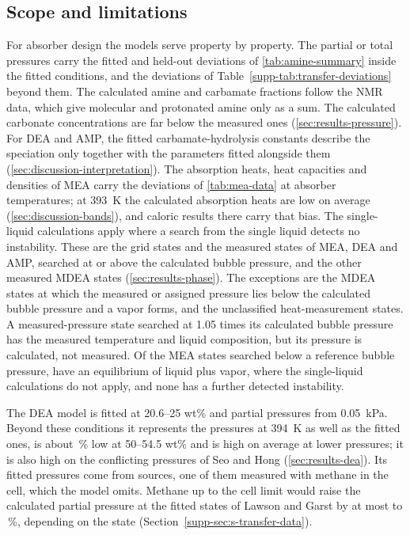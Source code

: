 \subsection{Scope and limitations}\label{sec:limits}
For absorber design the models serve property by property.
The \COtwo partial or total pressures carry the fitted and held-out deviations of \cref{tab:amine-summary} inside the fitted conditions, and the deviations of Table~\ref{supp-tab:transfer-deviations} beyond them.
The calculated amine and carbamate fractions follow the NMR data, which give molecular and protonated amine only as a sum.
The calculated carbonate concentrations are far below the measured ones (\cref{sec:results-pressure}).
For DEA and AMP, the fitted carbamate-hydrolysis constants describe the speciation only together with the parameters fitted alongside them (\cref{sec:discussion-interpretation}).
The absorption heats, heat capacities and densities of MEA carry the deviations of \cref{tab:mea-data} at absorber temperatures; at \SI{393}{\kelvin} the calculated absorption heats are low on average (\cref{sec:discussion-bands}), and caloric results there carry that bias.
The single-liquid calculations apply where a search from the single liquid detects no instability.
These are the grid states and the measured states of MEA, DEA and AMP, searched at or above the calculated bubble pressure, and the other measured MDEA states (\cref{sec:results-phase}).
The exceptions are the  MDEA states at which the measured or assigned pressure lies below the calculated bubble pressure and a vapor forms, and the  unclassified heat-measurement states.
A measured-pressure state searched at 1.05 times its calculated bubble pressure has the measured temperature and liquid composition, but its pressure is calculated, not measured.
Of the  MEA states searched below a reference bubble pressure,  have an equilibrium of liquid plus vapor, where the single-liquid calculations do not apply, and none has a further detected instability.

The DEA model is fitted at 20.6--25 wt\% and \COtwo partial pressures from \SI{0.05}{\kilo\pascal}.
Beyond these conditions it represents the pressures at \SI{394}{\kelvin} as well as the fitted ones, is about \,\% low at 50--54.5 wt\% and is high on average at lower pressures; it is also high on the conflicting pressures of Seo and Hong (\cref{sec:results-dea}).
Its fitted pressures come from  sources, one of them measured with methane in the cell, which the model omits.
Methane up to the cell limit would raise the calculated \COtwo partial pressure at the  fitted states of Lawson and Garst by at most  to \,\%, depending on the state (Section~\ref{supp-sec:s-transfer-data}).

